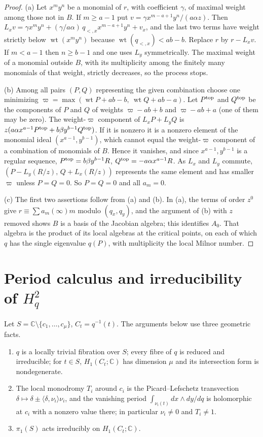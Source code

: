 \documentclass[11pt]{article}
\numberwithin{equation}{section}
\theoremstyle{definition}
\theoremstyle{remark}
\newcommand{\C}{\mathbb C}
\newcommand{\Hq}{H_q^2}
\newcommand{\wt}{\operatorname{wt}}
\begin{document}
\begin{proof}
(a) Let $x^my^n$ be a monomial of $r$, with coefficient $\gamma$, of maximal
weight among those not in $B$. If $m\ge a-1$ put $v=\gamma x^{m-a+1}y^n/(a\alpha z)$.
Then $L_xv=\gamma x^my^n+(\gamma/a\alpha)\,q_{<,x}x^{m-a+1}y^n+v_x$, and the last
two terms have weight strictly below $\wt(x^my^n)$ because
$\wt(q_{<,x})<ab-b$. Replace $r$ by $r-L_xv$. If $m<a-1$ then $n\ge b-1$ and one
uses $L_y$ symmetrically. The maximal weight of a monomial outside $B$, with its
multiplicity among the finitely many monomials of that weight, strictly
decreases, so the process stops.

(b) Among all pairs $(P,Q)$ representing the given combination choose one
minimizing $\varpi=\max(\wt P+ab-b,\ \wt Q+ab-a)$. Let $P^{\rm top}$ and $Q^{\rm top}$ be the components of $P$ and $Q$ of weights
$\varpi-ab+b$ and $\varpi-ab+a$ (one of them may be zero). The weight-$\varpi$
component of $L_xP+L_yQ$ is $z(a\alpha x^{a-1}P^{\rm top}+b\beta y^{b-1}Q^{\rm top})$. If it
is nonzero it is a nonzero element of the monomial ideal $(x^{a-1},y^{b-1})$,
which cannot equal the weight-$\varpi$ component of a combination of monomials
of $B$. Hence it vanishes, and since $x^{a-1},y^{b-1}$ is a regular sequence,
$P^{\rm top}=b\beta y^{b-1}R$, $Q^{\rm top}=-a\alpha x^{a-1}R$. As $L_x$ and $L_y$
commute, $(P-L_y(R/z),\,Q+L_x(R/z))$ represents the same element and has smaller
$\varpi$ unless $P=Q=0$. So $P=Q=0$ and all $a_m=0$.

(c) The first two assertions follow from (a) and (b). In (a), the terms of
order $z^0$ give $r\equiv\sum a_m(\infty)m$ modulo $(q_x,q_y)$, and the argument
of (b) with $z$ removed shows $B$ is a basis of the Jacobian algebra; this
identifies $A_0$. That algebra is the product of its local algebras at the
critical points, on each of which $q$ has the single eigenvalue $q(P)$, with
multiplicity the local Milnor number.
\end{proof}

\section{Period calculus and irreducibility of \texorpdfstring{$\Hq$}{Hq}}

Let $S=\C\setminus\{c_1,\dots,c_\mu\}$, $C_t=q^{-1}(t)$. The arguments below
use three geometric facts.
\begin{enumerate}[label=\textup{(G\arabic*)},leftmargin=2.8em]
\item $q$ is a locally trivial fibration over $S$; every fibre of $q$ is
 reduced and irreducible; for $t\in S$, $H_1(C_t;\C)$ has dimension $\mu$ and
 its intersection form is nondegenerate.
\item The local monodromy $T_i$ around $c_i$ is the Picard--Lefschetz
 transvection $\delta\mapsto\delta\pm\langle\delta,\nu_i\rangle\nu_i$, and the vanishing
 period $\int_{\nu_i(t)}dx\wedge dy/dq$ is holomorphic at $c_i$ with a nonzero
 value there; in particular $\nu_i\ne0$ and $T_i\ne1$.
\item $\pi_1(S)$ acts irreducibly on $H_1(C_t;\C)$.
\end{enumerate}
\end{document}
